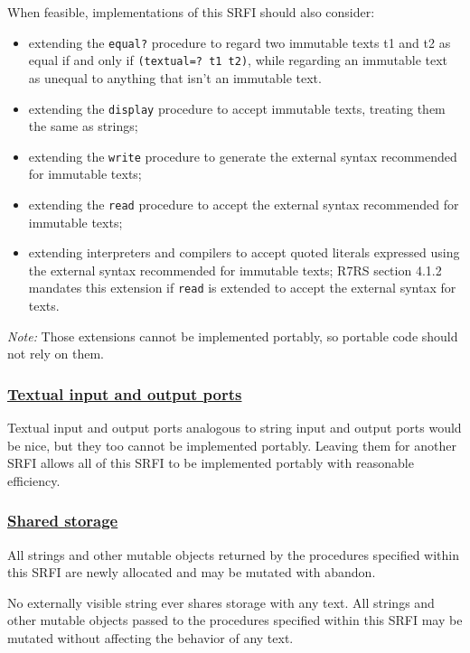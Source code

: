 When feasible, implementations of this SRFI should also consider:

\begin{itemize}
\tightlist
\item
  extending the \texttt{equal?} procedure to regard two immutable texts
  t1 and t2 as equal if and only if \texttt{(textual=?\ t1\ t2)}, while
  regarding an immutable text as unequal to anything that isn't an
  immutable text.
\item
  extending the \texttt{display} procedure to accept immutable texts,
  treating them the same as strings;
\item
  extending the \texttt{write} procedure to generate the external syntax
  recommended for immutable texts;
\item
  extending the \texttt{read} procedure to accept the external syntax
  recommended for immutable texts;
\item
  extending interpreters and compilers to accept quoted literals
  expressed using the external syntax recommended for immutable texts;
  R7RS section 4.1.2 mandates this extension if \texttt{read} is
  extended to accept the external syntax for texts.
\end{itemize}

\emph{Note:} Those extensions cannot be implemented portably, so
portable code should not rely on them.

\subsubsection{\texorpdfstring{\href{}{Textual input and output
ports}}{Textual input and output ports}}\label{textual-input-and-output-ports}

Textual input and output ports analogous to string input and output
ports would be nice, but they too cannot be implemented portably.
Leaving them for another SRFI allows all of this SRFI to be implemented
portably with reasonable efficiency.

\subsubsection{\texorpdfstring{\href{}{Shared
storage}}{Shared storage}}\label{shared-storage}

All strings and other mutable objects returned by the procedures
specified within this SRFI are newly allocated and may be mutated with
abandon.

No externally visible string ever shares storage with any text. All
strings and other mutable objects passed to the procedures specified
within this SRFI may be mutated without affecting the behavior of any
text.


